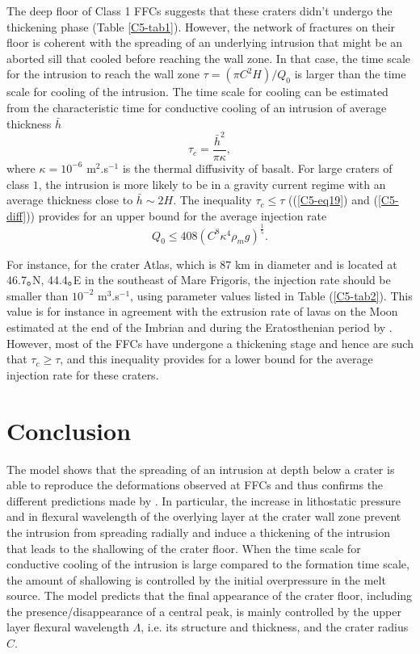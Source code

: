The deep  floor of  Class 1  FFCs suggests  that these  craters didn't
undergo  the thickening  phase  (Table  \ref{C5-tab1}).  However,  the
network of fractures on their floor  is coherent with the spreading of
an  underlying intrusion  that might  be an  aborted sill  that cooled
before reaching the  wall zone.  In that case, the  time scale for the
intrusion to  reach the wall  zone $\tau=(\pi C^2 H)/Q_{0}$  is larger
than the time scale for cooling  of the intrusion.  The time scale for
cooling can be  estimated from the characteristic  time for conductive
cooling of an intrusion of average thickness $\bar{h}$
\begin{equation}
  \tau_{c}= \frac{\bar{h}^{2}}{\pi\kappa},
  \label{C5-diff}
\end{equation}
where $\kappa=10^{-6}$ m$^{2}$.s$^{-1}$ is  the thermal diffusivity of
basalt. For large  craters of class $1$, the intrusion  is more likely
to be in  a gravity current regime with an  average thickness close to
$\bar{h}\sim2H$.  The inequality  $\tau_{c} \le \tau$ ((\ref{C5-eq19})
and  (\ref{C5-diff})) provides  for  an upper  bound  for the  average
injection rate
\begin{equation}
  Q_{0}\le408 (C^{8}\kappa^{4}\rho_{m}g)^{\frac{1}{5}}.
  \label{C5-eq5-3}
\end{equation}

For instance, for  the crater Atlas, which is $87$  km in diameter and
is located  at 46.7｡N, 44.4｡E in  the southeast of Mare  Frigoris, the
injection  rate should  be  smaller  than $10^{-2}$  m$^{3}$.s$^{-1}$,
using parameter values listed in  Table (\ref{C5-tab2}). This value is
for instance in agreement with the extrusion rate of lavas on the Moon
estimated  at the  end of  the  Imbrian and  during the  Eratosthenian
period  by  \citet{Head:1992bk}.   However,  most  of  the  FFCs  have
undergone   a    thickening   stage   and   hence    are   such   that
$\tau_{c} \ge  \tau$, and this  inequality provides for a  lower bound
for the average injection rate for these craters.
 		
\section{Conclusion}
		
The model  shows that the spreading  of an intrusion at  depth below a
crater is able to reproduce the deformations observed at FFCs and thus
confirms the different predictions made by \citet{Schultz:1976kt}.  In
particular,  the  increase in  lithostatic  pressure  and in  flexural
wavelength of the overlying layer at  the crater wall zone prevent the
intrusion  from spreading  radially  and induce  a  thickening of  the
intrusion that leads  to the shallowing of the crater  floor. When the
time scale for  conductive cooling of the intrusion  is large compared
to the formation time scale, the amount of shallowing is controlled by
the initial overpressure  in the melt source. The  model predicts that
the   final   appearance   of   the  crater   floor,   including   the
presence/disappearance of a central peak,  is mainly controlled by the
upper  layer flexural  wavelength $\Lambda$,  i.e.  its  structure and
thickness, and the crater radius $C$.
	
